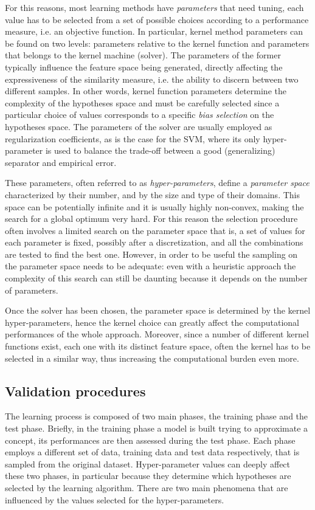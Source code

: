 For this reasons, most learning methods have \emph{parameters} that need tuning,
each value has to be selected from a set of possible
choices according to a performance measure, i.e. an objective function.
In particular, kernel method parameters can be found on two levels:
parameters relative to the kernel function and parameters that belongs to the
kernel machine (solver).
The parameters of the former typically influence the feature space being generated,
directly affecting the expressiveness of the similarity measure, i.e. the ability
to discern between two different samples.
In other words, kernel function parameters determine the complexity of the hypotheses space
and must be carefully selected since a particular choice of values corresponds to
a specific \emph{bias selection} on the hypotheses space.
The parameters of the solver are usually employed as regularization coefficients, 
as is the case for the SVM, where its only hyper-parameter is used to balance the trade-off between a good
(generalizing) separator and empirical error.

These parameters, often referred to as \emph{hyper-parameters}, define a
\emph{parameter space} characterized by their number, and by the size and type
of their domains.
This space can be potentially infinite and it is usually highly non-convex, making
the search for a global optimum very hard.
For this reason the selection procedure often involves a limited search on the parameter space
that is, a set of values for each parameter is fixed, possibly after a discretization,
and all the combinations are tested to find the best one.
However, in order to be useful the sampling on the parameter space needs to be adequate:
even with a heuristic approach the complexity of this search can still be daunting because
it depends on the number of parameters.

Once the solver has been chosen, the parameter space is determined by the kernel
hyper-parameters, hence the kernel choice can greatly affect the computational
performances of the whole approach.
Moreover, since a number of different kernel functions exist, each one with its distinct
feature space, often the kernel has to be selected in a similar way, thus increasing the
computational burden even more.

\subsection{Validation procedures}
The learning process is composed of two main phases, the training phase and
the test phase.
Briefly, in the training phase a model is built trying to approximate a concept, its performances
are then assessed during the test phase.
Each phase employs a different set of data, training data and test data respectively,
that is sampled from the original dataset.
Hyper-parameter values can deeply affect these two phases, in particular
because they determine which hypotheses are selected by the learning algorithm.
There are two main phenomena that are influenced by the values selected for the
hyper-parameters.

